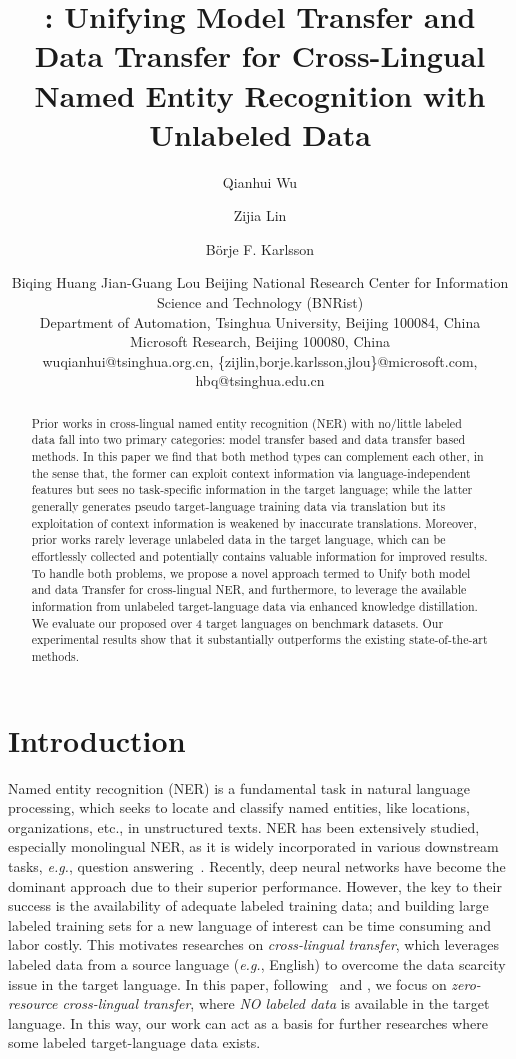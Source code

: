\documentclass{article}
\title{\unitrans{} : Unifying Model Transfer and Data Transfer for Cross-Lingual \\Named Entity Recognition with Unlabeled Data}
\author{
Qianhui Wu
\and
Zijia Lin\and
Börje F. Karlsson\and
Biqing Huang\And
Jian-Guang Lou
\affiliations
Beijing National Research Center for Information Science and Technology (BNRist)\\
Department of Automation, Tsinghua University, Beijing 100084, China\\
Microsoft Research, Beijing 100080, China\\
\emails
wuqianhui@tsinghua.org.cn,
\{zijlin,borje.karlsson,jlou\}@microsoft.com,
hbq@tsinghua.edu.cn
}
\newcommand\eg{\textit{e.g.}}
\newcommand\unitrans{\text{UniTrans}}
\begin{document}
\maketitle

\begin{abstract}
        Prior works in cross-lingual named entity recognition (NER) with no/little labeled data fall into two primary categories: model transfer based and data transfer based methods. 
        In this paper we find that both method types can complement each other, in the sense that, the former can exploit context information via language-independent features but sees no task-specific information in the target language; while the latter generally generates pseudo target-language training data via translation but its exploitation of context information is weakened by inaccurate translations.
        Moreover, prior works rarely leverage unlabeled data in the target language, which can be effortlessly collected and potentially contains valuable information for improved results.
        To handle both problems, we propose a novel approach termed \unitrans{} to Unify both model and data Transfer for cross-lingual NER, and furthermore, to leverage the available information from unlabeled target-language data via enhanced knowledge distillation.
        We evaluate our proposed \unitrans{} over 4 target languages on benchmark datasets.
        Our experimental results show that it substantially outperforms the existing state-of-the-art methods.
\end{abstract}

\section{Introduction}

Named entity recognition (NER) is a fundamental task in natural language processing, which seeks to locate and classify named entities, like locations, organizations, etc., in unstructured texts. NER has been extensively studied, especially monolingual NER, as it is widely incorporated in various downstream tasks, \eg{}, question answering~\cite{molla2006named}. 
Recently, deep neural networks have become the dominant approach due to their superior performance. 
However, the key to their success is the availability of adequate labeled training data; and building large labeled training sets for a new language of interest can be time consuming and labor costly.
This motivates researches on \emph{cross-lingual transfer}, which leverages labeled data from a source language (\eg, English) to overcome the data scarcity issue in the target language. 
In this paper, following~\cite{wu2019beto} and \cite{wu2020enhanced}, we focus on \emph{zero-resource cross-lingual transfer}, where \emph{NO labeled data} is available in the target language.
In this way, our work can act as a basis for further researches where some labeled target-language data exists. 
\end{document}
